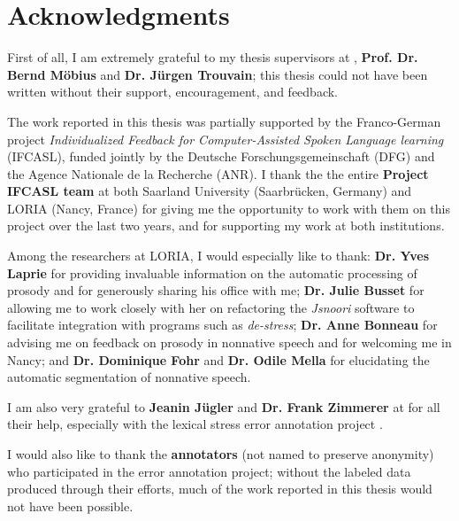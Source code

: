%
\chapter*{Acknowledgments}
\label{sec:thanks}
\vspace*{-10mm}


First of all, I am extremely grateful to my thesis supervisors at {\thesisUniversity}, \textbf{Prof. Dr. Bernd Möbius} and \textbf{Dr. Jürgen Trouvain}; this thesis could not have been written without their support, encouragement, and feedback.

The work reported in this thesis was partially supported by the Franco-German project \textit{Individualized Feedback for Computer-Assisted Spoken Language learning} (IFCASL), funded jointly by the Deutsche Forschungsgemeinschaft (DFG) and the Agence Nationale de la Recherche (ANR). I thank the the entire \textbf{Project IFCASL team} at both Saarland University (Saarbrücken, Germany) and LORIA (Nancy, France) for giving me the opportunity to work with them on this project over the last two years, and for supporting my work at both institutions.

Among the researchers at LORIA, I would especially like to thank:
\textbf{Dr. Yves Laprie} for providing invaluable information on the automatic processing of prosody and for generously sharing his office with me;
\textbf{Dr. Julie Busset} for allowing me to work closely with her on refactoring the \textit{Jsnoori} software to facilitate integration with programs such as \textit{de-stress};
\textbf{Dr. Anne Bonneau} for advising me on feedback on prosody in nonnative speech and for welcoming me in Nancy;
and 
\textbf{Dr. Dominique Fohr} and \textbf{Dr. Odile Mella} for elucidating the automatic segmentation of nonnative speech. 

I am also very grateful to \textbf{Jeanin Jügler} and \textbf{Dr. Frank Zimmerer} at {\thesisUniversity} for all their help, especially with the lexical stress error annotation project . 

I would also like to thank the \textbf{annotators} (not named to preserve anonymity) who participated in the error annotation project; without the labeled data produced through their efforts, much of the work reported in this thesis would not have been possible.

